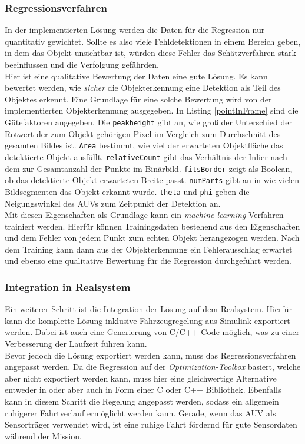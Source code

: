 \subsubsection{Regressionsverfahren}
\label{sec_learnWeights}
In der implementierten Lösung werden die Daten für die Regression nur quantitativ gewichtet. Sollte es also viele Fehldetektionen in einem Bereich geben, in dem das Objekt unsichtbar ist, würden diese Fehler das Schätzverfahren stark beeinflussen und die Verfolgung gefährden.\\
Hier ist eine qualitative Bewertung der Daten eine gute Lösung. Es kann bewertet werden, wie \textit{sicher} die Objekterkennung eine Detektion als Teil des Objektes erkennt. Eine Grundlage für eine solche Bewertung wird von der implementierten Objekterkennung ausgegeben. In Listing \ref{pointInFrame} sind die Gütefaktoren angegeben. Die \texttt{peakheight} gibt an, wie groß der Unterschied der Rotwert der zum Objekt gehörigen Pixel im Vergleich zum Durchschnitt des gesamten Bildes ist. \texttt{Area} bestimmt, wie viel der erwarteten Objektfläche das detektierte Objekt ausfüllt. \texttt{relativeCount} gibt das Verhältnis der Inlier nach dem \rans zur Gesamtanzahl der Punkte im Binärbild. \texttt{fitsBorder} zeigt als Boolean, ob das detektierte Objekt erwarteten Breite passt. \texttt{numParts} gibt an in wie vielen Bildsegmenten das Objekt erkannt wurde. \texttt{theta} und \texttt{phi} geben die Neigungswinkel des AUVs zum Zeitpunkt der Detektion an.\\
Mit diesen Eigenschaften als Grundlage kann ein \textit{machine learning} Verfahren trainiert werden. Hierfür können Trainingsdaten bestehend aus den Eigenschaften und dem Fehler von jedem Punkt zum echten Objekt herangezogen werden. Nach dem Training kann dann aus der Objekterkennung ein Fehlerausschlag erwartet und ebenso eine qualitative Bewertung für die Regression durchgeführt werden. 

\subsubsection{Integration in Realsystem}
Ein weiterer Schritt ist die Integration der Lösung auf dem Realsystem. Hierfür kann die komplette Lösung inklusive Fahrzeugregelung aus Simulink exportiert werden. Dabei ist auch eine Generierung von C/C++-Code möglich, was zu einer Verbesserung der Laufzeit führen kann.\\
Bevor jedoch die Lösung exportiert werden kann, muss das Regressionsverfahren angepasst werden. Da die Regression auf der \textit{Optimization-Toolbox} basiert, welche aber nicht exportiert werden kann, muss hier eine gleichwertige Alternative entweder in \matlab oder aber auch in Form einer C oder C++ Bibliothek.
Ebenfalls kann in diesem Schritt die Regelung angepasst werden, sodass ein allgemein ruhigerer Fahrtverlauf ermöglicht werden kann. Gerade, wenn das AUV als Sensorträger verwendet wird, ist eine ruhige Fahrt fördernd für gute Sensordaten während der Mission.